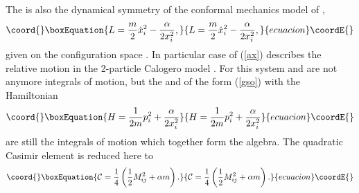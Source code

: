 \documentclass[a4paper,12pt]{article}
\def\R{\mathbb R}
\begin{document}
The \coordHE{} is also the dynamical symmetry
of the conformal mechanics model of \cite{AFF},
\begin{equation}\coord{}\boxEquation{
L=\frac{m}{2}\dot{x}_i^2-\frac{\alpha}{2x_i^2},
\label{ax}
}{
L=\frac{m}{2}\dot{x}_i^2-\frac{\alpha}{2x_i^2},
}{ecuacion}\coordE{}\end{equation}
given on the configuration space
\myHighlight{${\cal R}^d=\R^{d}-\{0\}$}\coordHE{}.
In particular case of \coordHE{}
(\ref{ax})
describes the relative
motion in the
2-particle Calogero model \cite{Calog}.
For this system \coordHE{} and \coordHE{}
are
not anymore integrals of motion, but the
\coordHE{} and \coordHE{}
of the form (\ref{gso}) with the Hamiltonian
\begin{equation}\coord{}\boxEquation{
H=\frac{1}{2m}p_i^2+\frac{\alpha}{2x_i^2}
\label{h1r}
}{
H=\frac{1}{2m}p_i^2+\frac{\alpha}{2x_i^2}
}{ecuacion}\coordE{}\end{equation}
are still the integrals of motion which together
form the \coordHE{} algebra.
The \coordHE{} quadratic Casimir element
is reduced here
to
\begin{equation}\coord{}\boxEquation{
{\cal C}=\frac{1}{4}\left(\frac{1}{2}M_{ij}^2+\alpha
m\right).
\label{calp}
}{
{\cal C}=\frac{1}{4}\left(\frac{1}{2}M_{ij}^2+\alpha
m\right).
}{ecuacion}\coordE{}\end{equation}
\end{document}
